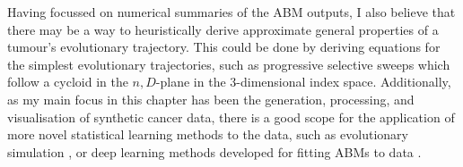 Having focussed on numerical summaries of the ABM outputs, I also believe that
there may be a way to heuristically derive approximate general properties of a
tumour's evolutionary trajectory. This could be done by deriving equations for
the simplest evolutionary trajectories, such as progressive selective sweeps
which follow a cycloid in the $n,D$-plane in the $3$-dimensional index space.
Additionally, as my main focus in this chapter has been the generation,
processing, and visualisation of synthetic cancer data, there is a good scope
for the application of more novel statistical learning methods to the data,
such as evolutionary simulation \cite{herald_autonomous_2022}, or deep learning
methods developed for fitting ABMs to data \cite{cess_fitting_2023}.


